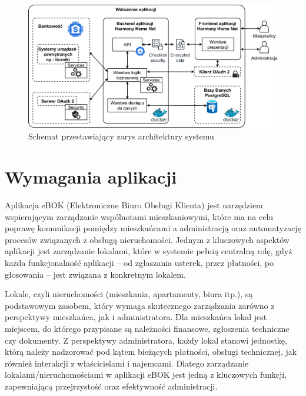 \begin{figure}[H]
	\centering
		\includegraphics[width=1.1\linewidth]{Schematy/zarys_architektury}
		\caption{Schemat przestawiający zarys architektury systemu}
	\label{fig:zarys_architektury}
\end{figure}



\section{Wymagania aplikacji}



Aplikacja eBOK (Elektroniczne Biuro Obsługi Klienta) jest narzędziem wspierającym zarządzanie wspólnotami mieszkaniowymi, które ma na celu poprawę komunikacji pomiędzy mieszkańcami a administracją oraz automatyzację procesów związanych z obsługą nieruchomości. Jednym z kluczowych aspektów aplikacji jest zarządzanie lokalami, które w systemie pełnią centralną rolę, gdyż każda funkcjonalność aplikacji – od zgłaszania usterek, przez płatności, po głosowania – jest związana z konkretnym lokalem.

Lokale, czyli nieruchomości (mieszkania, apartamenty, biura itp.), są podstawowym zasobem, który wymaga skutecznego zarządzania zarówno z perspektywy mieszkańca, jak i administratora. Dla mieszkańca lokal jest miejscem, do którego przypisane są należności finansowe, zgłoszenia techniczne czy dokumenty. Z perspektywy administratora, każdy lokal stanowi jednostkę, którą należy nadzorować pod kątem bieżących płatności, obsługi technicznej, jak również interakcji z właścicielami i najemcami. Dlatego zarządzanie lokalami/nieruchomościami w aplikacji eBOK jest jedną z kluczowych funkcji, zapewniającą przejrzystość oraz efektywność administracji.


